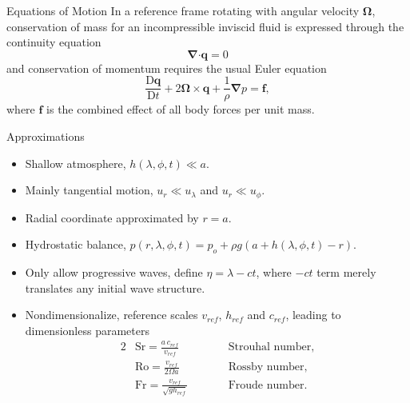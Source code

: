 \documentclass[pdf,distiller]{prosper}
\providecommand\bnabla{\boldsymbol{\nabla}}
\providecommand\bcdot{\boldsymbol{\cdot}}
\begin{document}
\begin{slide}{Equations of Motion}
In a reference frame rotating with angular velocity $\boldsymbol{\Omega}$, conservation of mass for an incompressible inviscid fluid is expressed through the continuity equation
\begin{equation}
  \bnabla\bcdot\boldsymbol{q} = 0
  \label{eq:mass1}
\end{equation}
and conservation of momentum requires the usual Euler equation
\begin{equation}
	\frac{\mathrm{D}\boldsymbol{q}}{\mathrm{D} t} + 2 \boldsymbol{\Omega} \times \boldsymbol{q} + \frac{1}{\rho} \bnabla p = \boldsymbol{f},
  \label{eq:momentum1}
\end{equation}
where $\boldsymbol{f}$ is the combined effect of all body forces per unit mass.
\end{slide}

\begin{slide}{Approximations}
\begin{itemize}
\item Shallow atmosphere, $h(\lambda,\phi,t) \ll a$.
\item Mainly tangential motion, $u_r \ll u_{\lambda}$ and $u_r \ll u_{\phi}$.
\item Radial coordinate approximated by $r=a$.
\item Hydrostatic balance, $p(r,\lambda,\phi,t)=p_o + \rho g (a+h(\lambda,\phi,t)-r)$.
\item Only allow progressive waves, define $\eta = \lambda - c t$, where $-ct$ term merely translates any initial wave structure.
\item Nondimensionalize, reference scales $v_{\scriptstyle ref}$, $h_{\scriptstyle ref}$ and $c_{\scriptstyle ref}$, leading to dimensionless parameters \\
\begin{alignat*}{2}
&\mathrm{Sr} = \frac{a\,c_{\scriptstyle ref}}{v_{\scriptstyle ref}} &\qquad& \mbox{Strouhal number,} \\
&\mathrm{Ro} = \frac{v_{\scriptstyle ref}}{2 \Omega a} && \mbox{Rossby number,} 
\\
&\mathrm{Fr} =  \frac{v_{\scriptstyle ref}}{\sqrt{g h_{\scriptstyle ref}}} && \mbox{Froude number.}
\end{alignat*}
\end{itemize}
\end{slide}
\end{document}
